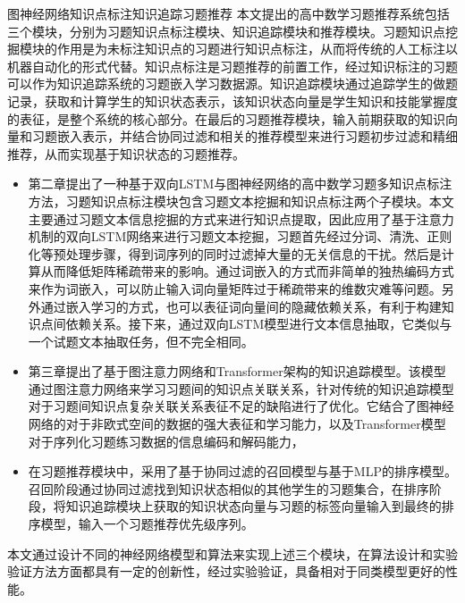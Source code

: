 \begin{abstractC}{图神经网络}{知识点标注}{知识追踪}{习题推荐}{}
    本文提出的高中数学习题推荐系统包括三个模块，分别为习题知识点标注模块、知识追踪模块和推荐模块。习题知识点挖掘模块的作用是为未标注知识点的习题进行知识点标注，从而将传统的人工标注以机器自动化的形式代替。知识点标注是习题推荐的前置工作，经过知识标注的习题可以作为知识追踪系统的习题嵌入学习数据源。知识追踪模块通过追踪学生的做题记录，获取和计算学生的知识状态表示，该知识状态向量是学生知识和技能掌握度的表征，是整个系统的核心部分。在最后的习题推荐模块，输入前期获取的知识向量和习题嵌入表示，并结合协同过滤和相关的推荐模型来进行习题初步过滤和精细推荐，从而实现基于知识状态的习题推荐。
    \begin{itemize}
        \item 第二章提出了一种基于双向LSTM与图神经网络的高中数学习题多知识点标注方法，习题知识点标注模块包含习题文本挖掘和知识点标注两个子模块。本文主要通过习题文本信息挖掘的方式来进行知识点提取，因此应用了基于注意力机制的双向LSTM网络来进行习题文本挖掘，习题首先经过分词、清洗、正则化等预处理步骤，得到词序列的同时过滤掉大量的无关信息的干扰。然后是计算从而降低矩阵稀疏带来的影响。通过词嵌入的方式而非简单的独热编码方式来作为词嵌入，可以防止输入词向量矩阵过于稀疏带来的维数灾难等问题。另外通过嵌入学习的方式，也可以表征词向量间的隐藏依赖关系，有利于构建知识点间依赖关系。接下来，通过双向LSTM模型进行文本信息抽取，它类似与一个试题文本抽取任务，但不完全相同。
        \item 第三章提出了基于图注意力网络和Transformer架构的知识追踪模型。该模型通过图注意力网络来学习习题间的知识点关联关系，针对传统的知识追踪模型对于习题间知识点复杂关联关系表征不足的缺陷进行了优化。它结合了图神经网络的对于非欧式空间的数据的强大表征和学习能力，以及Transformer模型对于序列化习题练习数据的信息编码和解码能力，
        \item 在习题推荐模块中，采用了基于协同过滤的召回模型与基于MLP的排序模型。召回阶段通过协同过滤找到知识状态相似的其他学生的习题集合，在排序阶段，将知识追踪模块上获取的知识状态向量与习题的标签向量输入到最终的排序模型，输入一个习题推荐优先级序列。
    \end{itemize}

    本文通过设计不同的神经网络模型和算法来实现上述三个模块，在算法设计和实验验证方法方面都具有一定的创新性，经过实验验证，具备相对于同类模型更好的性能。
\end{abstractC}
